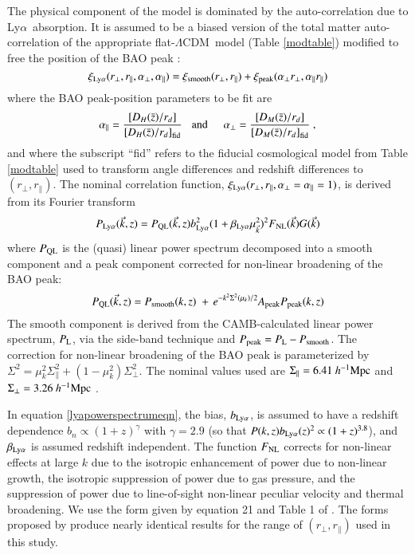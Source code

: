 \documentclass{aa}
\newcommand{\xilya}{\xi_{\rm Ly\alpha}}
\newcommand{\xismooth}{\xi_{\rm smooth}}
\newcommand{\xipeak}{\xi_{\rm peak}}
\newcommand{\apar}{\alpha_\parallel}
\newcommand{\aperp}{\alpha_\perp}
\newcommand{\hMpc}{h^{-1}{\rm Mpc}}
\newcommand{\Lya}{Ly$\alpha$~}
\newcommand{\DM}{D_M}
\newcommand{\DHub}{D_H}
\newcommand{\rperp}{r_\perp}
\newcommand{\rpar}{r_\parallel}
\newcommand{\lcdm}{$\Lambda$CDM~}
\newcommand{\betalya}{\beta_{\rm Ly\alpha}}
\newcommand{\blya}{b_{\rm Ly\alpha}}
\newcommand{\Apeak}{A_{\rm peak}}
\begin{document}
The physical component of the model is dominated by the auto-correlation
due to \Lya absorption.  It is assumed to be a biased version of
the  total matter auto-correlation of the appropriate flat-\lcdm model
(Table \ref{modtable}) modified to free the position of the BAO
peak \citep{2013JCAP...03..024K}:
\begin{equation}
  \xilya(\rperp,\rpar,\aperp,\apar) =
  \xismooth(\rperp,\rpar) + \xipeak(\aperp\rperp,\apar\rpar)
\end{equation}
where the BAO peak-position parameters to be fit are
\begin{equation}
\apar = \frac { \left[\DHub(\bar z)/r_d\right] }
{\left[D_H(\bar z)/r_d\right]_{\rm fid}}
\hspace*{3mm}{\rm and}\hspace*{5mm}
\aperp = \frac { \left[\DM(\bar z)/r_d\right] }
{\left[\DM(\bar z)/r_d\right]_{\rm fid}} ~,
\label{eq:alpha}
\end{equation}
and where the subscript ``fid'' refers to the fiducial cosmological
model from Table \ref{modtable} used to transform angle differences
and redshift differences to $(\rperp,\rpar)$.
The  nominal correlation function,
$\xilya(\rperp,\rpar,\aperp=\apar=1)$, is derived from
its Fourier transform
\begin{equation}
  P_{\rm Ly\alpha}(\vec{k},z)=P_{\rm QL}(\vec{k},z)
\blya^2(1+\betalya\mu_{\vec{k}}^2)^2
F_{\rm NL}(\vec{k})
G(\vec{k})
\label{lyapowerspectrumeqn}
\end{equation}
where $P_{\rm QL}$ is the (quasi) linear power spectrum decomposed
into a smooth component and a peak component corrected for non-linear
broadening of the BAO peak:
\begin{equation}
  P_{\rm QL}(\vec{k},z)= P_{\rm smooth}(k,z)\; +\,
 e^{-k^2\Sigma^2(\mu_k)/2}
   \Apeak P_{\rm peak}(k,z)
\label{peaksmooth}
\end{equation}
The smooth component is derived from the CAMB-calculated linear
power spectrum, $P_{\rm L}$,
via the side-band technique \citep{2013JCAP...03..024K} 
and $P_{\rm peak}=P_{\rm L}-P_{\rm smooth}$.
The correction for non-linear broadening of the BAO peak is parameterized by
$\Sigma^2=\mu_k^2\Sigma_\parallel^2+(1-\mu_k^2)\Sigma_\perp^2$.
The nominal values used
are $\Sigma_\parallel=6.41~\hMpc$ and $\Sigma_\perp=3.26~\hMpc$
\citep{2013JCAP...03..024K}.

In equation \ref{lyapowerspectrumeqn},
the bias, $\blya$, is assumed to have a redshift dependence 
$b_n\propto(1+z)^\gamma$ with $\gamma=2.9$
(so that $P(k,z)\blya(z)^2\propto (1+z)^{3.8}$),
and $\betalya$ is assumed redshift independent.
The function $F_{\rm NL}$ corrects for
non-linear effects at large $k$ due to
the isotropic enhancement of power due to non-linear growth,
the isotropic suppression of power due to gas pressure, and
the suppression of power due to line-of-sight non-linear
peculiar velocity and thermal broadening.
We use the form given by equation 21 and Table 1 of
\citet{2003ApJ...585...34M}.
The forms proposed by \citet{2015JCAP...12..017A}
produce nearly identical results for the range of $(\rperp,\rpar)$
used in this study.
\end{document}
